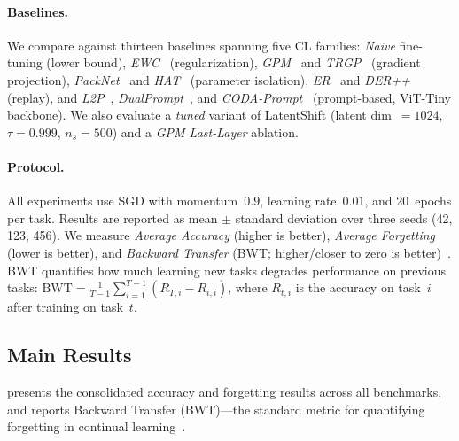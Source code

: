\documentclass{article}
\begin{document}
\paragraph{Baselines.}
We compare against thirteen baselines spanning five CL families:
\emph{Naive} fine-tuning (lower bound),
\emph{EWC}~\citep{kirkpatrick2017overcoming} (regularization),
\emph{GPM}~\citep{saha2021gradient} and \emph{TRGP}~\citep{lin2022trgp}
(gradient projection),
\emph{PackNet}~\citep{mallya2018packnet} and \emph{HAT}~\citep{serra2018overcoming}
(parameter isolation),
\emph{ER}~\citep{chaudhry2019tiny} and \emph{DER++}~\citep{buzzega2020dark}
(replay),
and \emph{L2P}~\citep{wang2022learning}, \emph{DualPrompt}~\citep{wang2022dualprompt},
and \emph{CODA-Prompt}~\citep{smith2023coda} (prompt-based, ViT-Tiny backbone).
We also evaluate a \emph{tuned} variant of LatentShift (latent dim~$= 1024$,
$\tau = 0.999$, $n_s = 500$) and a \emph{GPM Last-Layer} ablation.

\paragraph{Protocol.}
All experiments use SGD with momentum~$0.9$, learning rate~$0.01$, and
20~epochs per task. Results are reported as mean $\pm$ standard deviation
over three seeds (42, 123, 456). We measure \emph{Average Accuracy} (higher
is better), \emph{Average Forgetting} (lower is better), and \emph{Backward
Transfer} (BWT; higher/closer to zero is
better)~\citep{lopez2017gradient,delange2021continual}. BWT quantifies how much
learning new tasks degrades performance on previous tasks:
$\text{BWT} = \frac{1}{T-1}\sum_{i=1}^{T-1}(R_{T,i} - R_{i,i})$, where
$R_{t,i}$ is the accuracy on task~$i$ after training on task~$t$.

\subsection{Main Results}

 presents the consolidated accuracy and forgetting results
across all benchmarks, and  reports Backward Transfer
(BWT)---the standard metric for quantifying forgetting in continual
learning~\citep{lopez2017gradient}.
\end{document}
